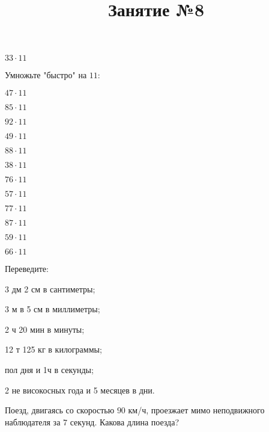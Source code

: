 \begin{listofex}
\begin{enumcols}[itemcolumns=5]
		\item \( 33\cdot11 \)
	\end{enumcols}
	\item Умножьте "быстро"{ }на \( 11 \):
	\begin{enumcols}[itemcolumns=4]
		\item \( 47\cdot11 \)
		\item \( 85\cdot11 \)
		\item \( 92\cdot11 \)
		\item \( 49\cdot11 \)
		\item \( 88\cdot11 \)
		\item \( 38\cdot11 \)
		\item \( 76\cdot11 \)
		\item \( 57\cdot11 \)
		\item \( 77\cdot11 \)
		\item \( 87\cdot11 \)
		\item \( 59\cdot11 \)
		\item \( 66\cdot11 \)
	\end{enumcols}
	\item Переведите:
	\begin{enumcols}[itemcolumns=1]
		\item 3 дм 2 см в сантиметры;
		\item 3 м в 5 см в миллиметры;
		\item 2 ч 20 мин в минуты;
		\item 12 т 125 кг в килограммы;
		\item пол дня и 1ч в секунды;
		\item 2 не високосных года и 5 месяцев в дни.
	\end{enumcols}
	\item Поезд, двигаясь со скоростью \( 90 \) км/ч, проезжает мимо неподвижного наблюдателя за \( 7 \) секунд. Какова длина поезда?
\end{listofex}
\newpage
\title{Занятие №8}
